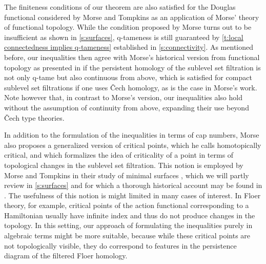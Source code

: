 The finiteness conditions of our theorem are also satisfied for the Douglas functional considered by Morse and Tompkins as an application of Morse' theory of functional topology.
While the condition proposed by Morse turns out to be insufficient as shown in \cref{s:surfaces}, q-tameness is still guaranteed by \cref{t:local connectedness implies q-tameness} established in \cref{s:connectivity}.
As mentioned before, our inequalities then agree with Morse's historical version from functional topology as presented in \cite{Morse.1940} if the persistent homology of the sublevel set filtration is not only q-tame but also continuous from above, which is satisfied for compact sublevel set filtrations if one uses \v{C}ech homology, as is the case in Morse's work.
Note however that, in contrast to Morse's version, our inequalities also hold without the assumption of continuity from above, expanding their use beyond \v{C}ech type theories.

\begin{rem} \label{r:homotopically critial points}
	In addition to the formulation of the inequalities in terms of cap numbers, Morse also proposes a generalized version of critical points, which he calls homotopically critical, and which formalizes the idea of criticality of a point in terms of topological changes in the sublevel set filtration.
	This notion is employed by Morse and Tompkins in their study of minimal surfaces \cite{Morse.1939}, which we will partly review in \cref{s:surfaces} and for which a thorough historical account may be found in \cite[Section II.6]{Struwe.1988}.
	The usefulness of this notion is might limited in many cases of interest.
	In Floer theory, for example, critical points of the action functional corresponding to a Hamiltonian usually have infinite index and thus do not produce changes in the topology.
	In this setting, our approach of formulating the inequalities purely in algebraic terms might be more suitable, because while these critical points are not topologically visible, they do correspond to features in the persistence diagram of the filtered Floer homology.
\end{rem}
